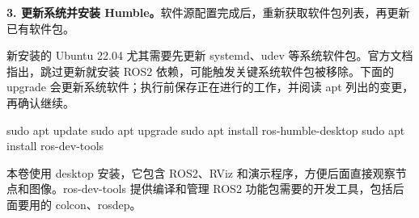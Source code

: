 \textbf{3. 更新系统并安装 Humble。}软件源配置完成后，重新获取软件包列表，再更新已有软件包。
\begin{note}
新安装的 Ubuntu 22.04 尤其需要先更新 systemd、udev 等系统软件包。官方文档指出，跳过更新就安装 ROS2 依赖，可能触发关键系统软件包被移除。下面的 upgrade 会更新系统软件；执行前保存正在进行的工作，并阅读 apt 列出的变更，再确认继续。
\end{note}
\par\medskip\noindent\begin{minipage}{\linewidth}
\begin{tbash}
sudo apt update
sudo apt upgrade
sudo apt install ros-humble-desktop
sudo apt install ros-dev-tools
\end{tbash}
\end{minipage}\par\smallskip
本卷使用 desktop 安装，它包含 ROS2、RViz 和演示程序，方便后面直接观察节点和图像。ros-dev-tools 提供编译和管理 ROS2 功能包需要的开发工具，包括后面要用的 colcon、rosdep。


